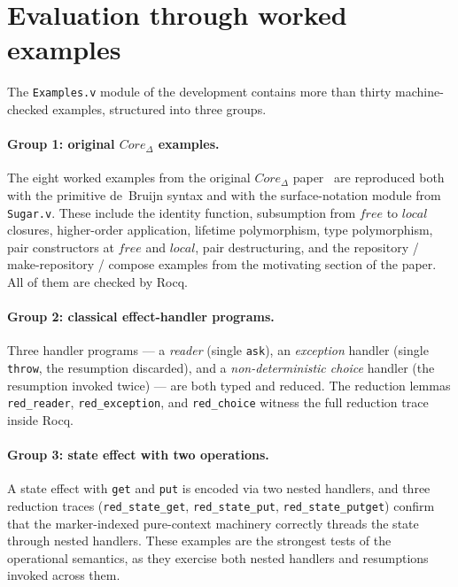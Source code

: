 \documentclass[12pt,a4paper]{article}
\begin{document}
    \section{Evaluation through worked examples} \label{sec:evaluation}

    The \texttt{Examples.v} module of the development contains more than thirty
    machine-checked examples, structured into three groups.

    \paragraph{Group 1: original $Core_\Delta$ examples.}
    The eight worked examples from the original $Core_\Delta$
    paper~\cite{stoyan2025existential} are reproduced both with the primitive de~Bruijn
    syntax and with the surface-notation module from \texttt{Sugar.v}.
    These include the identity function, subsumption from $free$ to $local$ closures,
    higher-order application, lifetime polymorphism, type polymorphism, pair
    constructors at $free$ and $local$, pair destructuring, and the
    repository / make-repository / compose examples from the
    motivating section of the paper.
    All of them are checked by Rocq.

    \paragraph{Group 2: classical effect-handler programs.}
    Three handler programs --- a \emph{reader} (single \texttt{ask}), an \emph{exception}
    handler (single \texttt{throw}, the resumption discarded), and a
    \emph{non-deterministic choice} handler (the resumption invoked twice) --- are
    both typed and reduced.
    The reduction lemmas \texttt{red\_reader}, \texttt{red\_exception}, and
    \texttt{red\_choice} witness the full reduction trace inside Rocq.

    \paragraph{Group 3: state effect with two operations.}
    A state effect with \texttt{get} and \texttt{put} is encoded via two nested handlers,
    and three reduction traces (\texttt{red\_state\_get}, \texttt{red\_state\_put},
    \texttt{red\_state\_putget}) confirm that the marker-indexed pure-context machinery
    correctly threads the state through nested handlers.
    These examples are the strongest tests of the operational semantics, as they exercise
    both nested handlers and resumptions invoked across them.
\end{document}
